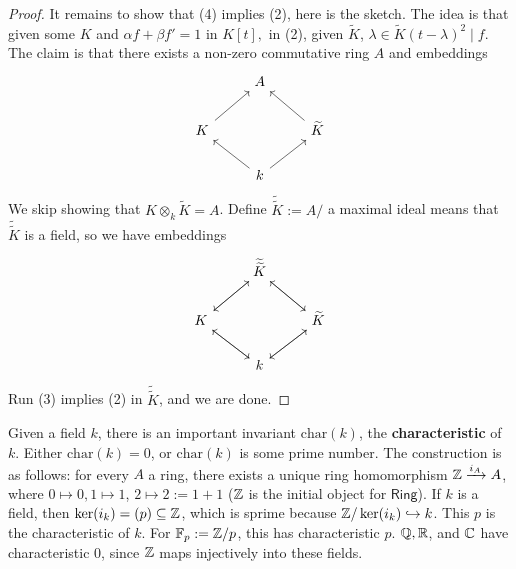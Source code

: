 \begin{proof}
    It remains to show that (4) implies (2), here is the sketch. The idea is that given some $K$ and $\alpha f+\beta f'=1$ in $K[t], $ in (2), given $\widetilde K$, $\lambda \in \widetilde K (t-\lambda)^2 \mid f$. The claim is that there exists a non-zero commutative ring $A$ and embeddings \[
    \begin{tikzcd}
             & A                       &                         \\
K \arrow[ru] &                         & \widetilde K \arrow[lu] \\
             & k \arrow[lu] \arrow[ru] &                        
\end{tikzcd}
    \] We skip showing that $K\otimes_k \widetilde K=A$. Define $\widetilde { \widetilde K}:=A /$ a maximal ideal means that $\widetilde { \widetilde K}$ is a field, so we have embeddings
\[
\begin{tikzcd}
                        & \widetilde{\widetilde K} \arrow[rd] \arrow[ld] &                                    \\
K \arrow[ru] \arrow[rd] &                                                & \widetilde K \arrow[lu] \arrow[ld] \\
                        & k \arrow[lu] \arrow[ru]                        &                                   
\end{tikzcd}
\] 
    Run (3) implies (2) in $\widetilde {\widetilde K} $, and we are done.
\end{proof}
Given a field $k$, there is an important invariant $\mathrm{char}(k)$, the \textbf{characteristic} of $k$. Either $\mathrm{char}(k)=0$, or $\mathrm{char}(k)$ is some prime number. The construction is as follows: for every $A$ a ring, there exists a unique ring homomorphism $\mathbb{Z} \xrightarrow{i_A}  A$, where $0 \mapsto 0, 1 \mapsto 1$, $2 \mapsto  2 :=1+1$ ($\mathbb{Z}$ is the initial object for $\mathsf{Ring} $). If $k$ is a field, then $\ker(i_k)=(p) \subseteq \mathbb{Z}$, which is sprime because $\mathbb{Z} / \ker(i_k) \hookrightarrow k$. This $p$ is the characteristic of $k$.
For $\mathbb{F}_p := \mathbb{Z} /p$, this has characteristic $p$. $\mathbb{Q},\mathbb{R}$, and $\mathbb{C}$ have characteristic $0$, since $\mathbb{Z}$ maps injectively into these fields.
